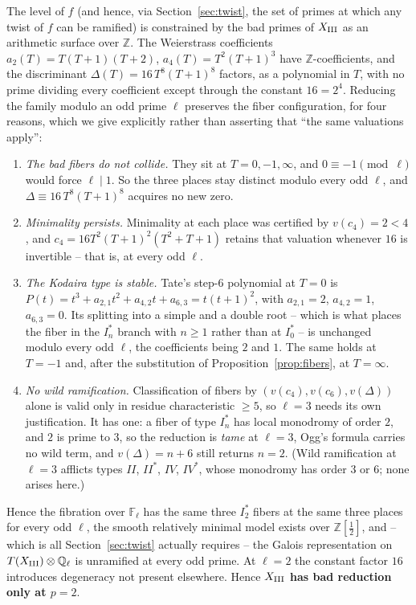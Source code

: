 \documentclass[11pt]{amsart}
\theoremstyle{definition}
\newcommand{\Q}{\mathbb{Q}}
\newcommand{\Z}{\mathbb{Z}}
\begin{document}
The level of $f$ (and hence, via Section~\ref{sec:twist}, the set of
primes at which any twist of $f$ can be ramified) is constrained by the
bad primes of $X_{\rm III}$ as an arithmetic surface over $\Z$. The
Weierstrass coefficients $a_2(T)=T(T+1)(T+2)$, $a_4(T)=T^2(T+1)^3$ have
$\Z$-coefficients, and the discriminant $\Delta(T)=16\,T^8(T+1)^8$
factors, as a polynomial in $T$, with no prime dividing every coefficient
except through the constant $16=2^4$. Reducing the family modulo an odd
prime $\ell$ preserves the fiber configuration, for four reasons, which we
give explicitly rather than asserting that ``the same valuations apply'':

\begin{enumerate}
\item \emph{The bad fibers do not collide.} They sit at $T=0,-1,\infty$,
and $0\equiv-1\pmod\ell$ would force $\ell\mid1$. So the three places stay
distinct modulo every odd $\ell$, and $\Delta\equiv16\,T^8(T+1)^8$ acquires
no new zero.
\item \emph{Minimality persists.} Minimality at each place was certified
by $v(c_4)=2<4$, and $c_4=16T^2(T+1)^2(T^2+T+1)$ retains that valuation
whenever $16$ is invertible -- that is, at every odd $\ell$.
\item \emph{The Kodaira type is stable.} Tate's step-$6$ polynomial at
$T=0$ is $P(t)=t^3+a_{2,1}t^2+a_{4,2}t+a_{6,3}=t(t+1)^2$, with
$a_{2,1}=2$, $a_{4,2}=1$, $a_{6,3}=0$. Its splitting into a simple and a
double root -- which is what places the fiber in the $I_n^*$ branch with
$n\geq1$ rather than at $I_0^*$ -- is unchanged modulo every odd $\ell$,
the coefficients being $2$ and $1$. The same holds at $T=-1$ and, after
the substitution of Proposition~\ref{prop:fibers}, at $T=\infty$.
\item \emph{No wild ramification.} Classification of fibers by
$(v(c_4),v(c_6),v(\Delta))$ alone is valid only in residue characteristic
$\geq5$, so $\ell=3$ needs its own justification. It has one: a fiber of
type $I_n^*$ has local monodromy of order $2$, and $2$ is prime to $3$, so
the reduction is \emph{tame} at $\ell=3$, Ogg's formula carries no wild
term, and $v(\Delta)=n+6$ still returns $n=2$. (Wild ramification at
$\ell=3$ afflicts types $II$, $II^*$, $IV$, $IV^*$, whose monodromy has
order $3$ or $6$; none arises here.)
\end{enumerate}

Hence the fibration over $\mathbb F_\ell$ has the same three $I_2^*$
fibers at the same three places for every odd $\ell$, the smooth
relatively minimal model exists over $\Z[\tfrac12]$, and -- which is all
Section~\ref{sec:twist} actually requires -- the Galois representation on
$T(X_{\rm III})\otimes\Q_\ell$ is unramified at every odd prime. At
$\ell=2$ the constant factor $16$ introduces degeneracy not present
elsewhere. Hence \textbf{$X_{\rm III}$ has bad reduction only at $p=2$}.
\end{document}
